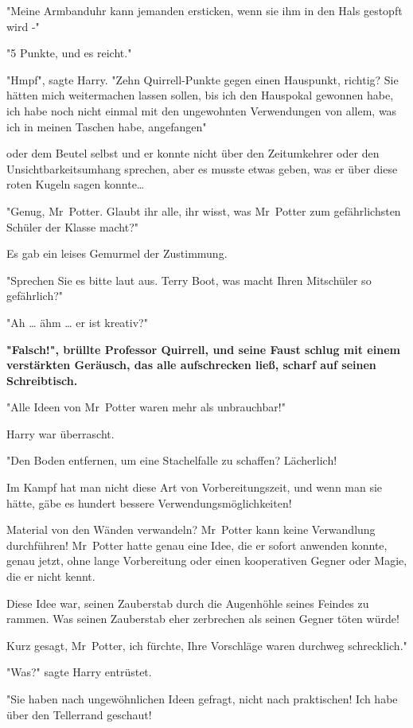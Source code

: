 {"Meine Armbanduhr kann jemanden ersticken, wenn sie ihm in den Hals gestopft wird -"

"5 Punkte, und es reicht."

"Hmpf", sagte Harry. "Zehn Quirrell-Punkte gegen einen Hauspunkt, richtig? Sie hätten mich weitermachen lassen sollen, bis ich den Hauspokal gewonnen habe, ich habe noch nicht einmal mit den ungewohnten Verwendungen von allem, was ich in meinen Taschen habe, angefangen"

oder dem Beutel selbst und er konnte nicht über den Zeitumkehrer oder den Unsichtbarkeitsumhang sprechen, aber es musste etwas geben, was er über diese roten Kugeln sagen konnte…

"Genug, Mr~Potter. Glaubt ihr alle, ihr wisst, was Mr~Potter zum gefährlichsten Schüler der Klasse macht?"

Es gab ein leises Gemurmel der Zustimmung.

"Sprechen Sie es bitte laut aus. Terry Boot, was macht Ihren Mitschüler so gefährlich?"

"Ah … ähm … er ist kreativ?"

\textbf{"Falsch!", brüllte Professor Quirrell, und seine Faust schlug mit einem verstärkten Geräusch, das alle aufschrecken ließ, scharf auf seinen Schreibtisch.}

"Alle Ideen von Mr~Potter waren mehr als unbrauchbar!"

Harry war überrascht.

"Den Boden entfernen, um eine Stachelfalle zu schaffen? Lächerlich!

Im Kampf hat man nicht diese Art von Vorbereitungszeit, und wenn man sie hätte, gäbe es hundert bessere Verwendungsmöglichkeiten!

Material von den Wänden verwandeln? Mr~Potter kann keine Verwandlung durchführen! Mr~Potter hatte genau eine Idee, die er sofort anwenden konnte, genau jetzt, ohne lange Vorbereitung oder einen kooperativen Gegner oder Magie, die er nicht kennt.

Diese Idee war, seinen Zauberstab durch die Augenhöhle seines Feindes zu rammen. Was seinen Zauberstab eher zerbrechen als seinen Gegner töten würde!

Kurz gesagt, Mr~Potter, ich fürchte, Ihre Vorschläge waren durchweg schrecklich."

"Was?" sagte Harry entrüstet.

"Sie haben nach ungewöhnlichen Ideen gefragt, nicht nach praktischen! Ich habe über den Tellerrand geschaut!

}
